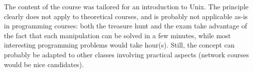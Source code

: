 \documentclass{sig-alternate}
\begin{document}
The content of the course was tailored for an introduction to Unix.
The principle clearly does not apply to theoretical courses, and is
probably not applicable as-is in programming courses: both the
treasure hunt and the exam take advantage of the fact that each
manipulation can be solved in a few minutes, while most interesting
programming problems would take hour(s). Still, the concept can
probably be adapted to other classes involving practical aspects
(network courses would be nice candidates).



\end{document}
